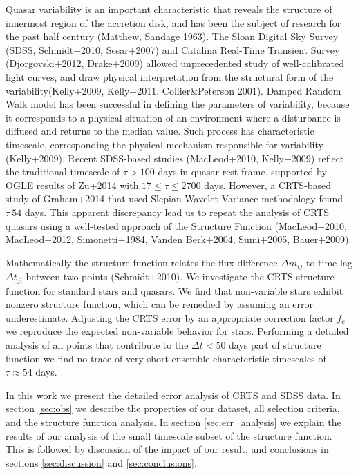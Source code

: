 \documentclass[a4paper,fleqn,usenatbib]{mnras}
\begin{document}
Quasar variability is an important characteristic that reveals the structure of innermost region of the accretion disk, and has been the subject of research for the past half century (Matthew, Sandage 1963).   The Sloan Digital Sky Survey (SDSS, Schmidt+2010, Sesar+2007) and Catalina Real-Time Transient Survey (Djorgovski+2012, Drake+2009) allowed unprecedented study of well-calibrated light curves, and draw physical interpretation from the structural form of the variability(Kelly+2009, Kelly+2011, Collier\&Peterson 2001). Damped Random Walk model has been successful in defining the parameters of variability, because it corresponds to a physical situation of an environment where a disturbance is diffused and returns to the median value. Such process has characteristic timescale, corresponding the physical mechanism responsible for variability (Kelly+2009).  Recent SDSS-based studies (MacLeod+2010, Kelly+2009) reflect the traditional timescale of $\tau > 100 $ days in quasar rest frame, supported by OGLE results of Zu+2014 with $ 17 \leq \tau \leq 2700 $ days. However, a CRTS-based study of Graham+2014 that used Slepian Wavelet Variance methodology found $\tau ~ 54$ days. This apparent discrepancy lead us to repeat the analysis of CRTS quasars using a  well-tested approach of the Structure Function (MacLeod+2010, MacLeod+2012, Simonetti+1984, Vanden Berk+2004, Sumi+2005, Bauer+2009). 

Mathematically the structure function relates the flux difference $\Delta m_{ij}$ to time lag $\Delta t_{ji}$  between two points (Schmidt+2010). We investigate the CRTS structure function for standard stars and quasars. We find that non-variable stars exhibit nonzero structure function, which can be remedied by assuming an error underestimate. Adjusting the CRTS error by an appropriate correction factor $f_{c}$ we reproduce the expected non-variable behavior for stars. Performing a detailed analysis of all points that contribute to the  $\Delta t < 50$ days part of structure function we find no trace of very short ensemble characteristic timescales of $\tau \approx 54$ days. 
 
In this work we present the detailed error analysis of CRTS and SDSS data. In section \ref{sec:obs} we describe the properties of our dataset, all selection criteria, and the structure function analysis.  In section \ref{sec:err_analysis} we explain the results of our analysis of the small timescale subset of the structure function. This is followed by discussion of the impact of our result, and conclusions in sections \ref{sec:discussion} and \ref{sec:conclusions}.
 
\end{document}
